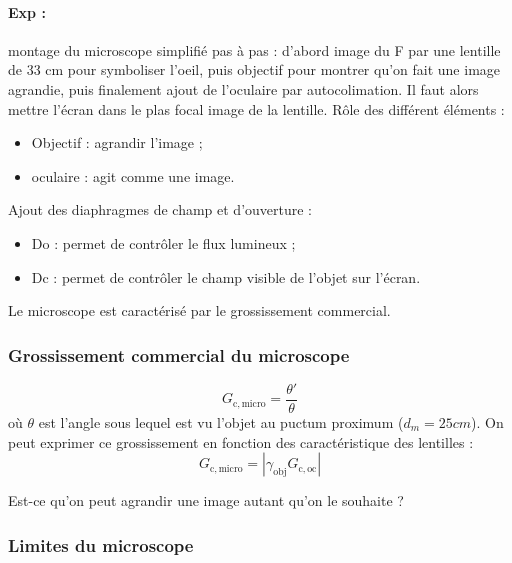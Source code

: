 \paragraph{Exp : } montage du microscope simplifié pas à pas : d'abord image du F par une lentille de 33 cm pour symboliser l'oeil, puis objectif pour montrer qu'on fait une image agrandie, puis finalement ajout de l'oculaire par autocolimation.
Il faut alors mettre l'écran dans le plas focal image de la lentille.
Rôle des différent éléments :
\begin{itemize}
\item Objectif : agrandir l'image ;
\item oculaire : agit comme une image.
\end{itemize}
Ajout des diaphragmes de champ et d'ouverture :
\begin{itemize}
\item Do : permet de contrôler le flux lumineux ;
\item Dc : permet de contrôler le champ visible de l'objet sur l'écran. 
\end{itemize}

Le microscope est caractérisé par le grossissement commercial.

\subsubsection{Grossissement commercial du microscope}

\begin{equation}
G_\mathrm{c, micro} = \frac{\theta '}{\theta}
\end{equation}
où $\theta$ est l'angle sous lequel est vu l'objet au puctum proximum ($d_m=\unit{25}{cm}$).
On peut exprimer ce grossissement en fonction des caractéristique des lentilles :
\begin{equation}
G_\mathrm{c, micro} = |\gamma_\mathrm{obj}G_\mathrm{c, oc}|
\end{equation}

Est-ce qu'on peut agrandir une image autant qu'on le souhaite ?

\subsubsection{Limites du microscope}


